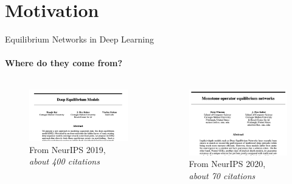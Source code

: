 \documentclass[8pt, t,
aspectratio=169,%
]{beamer}
\begin{document}
\section{Motivation}
\begin{frame}{Equilibrium Networks in Deep Learning}
    \framesubtitle{Where do they come from?}
    \begin{columns}[T]
            \begin{figure}
                \includegraphics[width=\textwidth]{deq.png}
                \caption{From NeurIPS 2019, \emph{about 400 citations} \cite{bai2019deep}}
            \end{figure}
            \pause
            \begin{figure}
                \includegraphics[width=\textwidth]{mon_deq.png}
                \caption{From NeurIPS 2020, \emph{about 70 citations} \cite{winston2020monotone}}
            \end{figure}
            \pause

\end{columns}
\end{frame}
\end{document}
